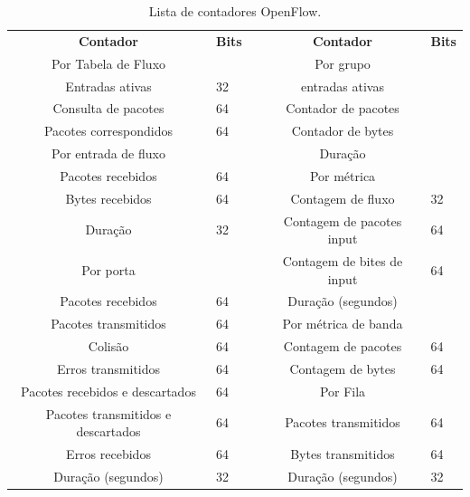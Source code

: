 \begin{table}[]
\caption{Lista de contadores OpenFlow.}
\label{tab:contadores}
\begin{tabular}{|c|l|l|c|l|}
\cline{1-2} \cline{4-5}
\textbf{Contador} & \textbf{Bits} &  & \textbf{Contador} & \multicolumn{1}{c|}{\textbf{Bits}} \\ \cline{1-2} \cline{4-5} 
Por Tabela de Fluxo &  &  & Por grupo & \multicolumn{1}{c|}{} \\ \cline{1-2} \cline{4-5} 
Entradas ativas & 32 &  & entradas ativas &  \\ \cline{1-2} \cline{4-5} 
Consulta de pacotes & 64 &  & Contador de pacotes &  \\ \cline{1-2} \cline{4-5} 
Pacotes correspondidos & 64 &  & Contador de bytes &  \\ \cline{1-2} \cline{4-5} 
Por entrada de fluxo &  &  & Duração &  \\ \cline{1-2} \cline{4-5} 
Pacotes recebidos & 64 &  & Por métrica & \multicolumn{1}{c|}{} \\ \cline{1-2} \cline{4-5} 
Bytes recebidos & 64 &  & Contagem de fluxo & 32 \\ \cline{1-2} \cline{4-5} 
Duração & 32 &  & Contagem de pacotes input & 64 \\ \cline{1-2} \cline{4-5} 
Por porta &  &  & Contagem de bites de input & 64 \\ \cline{1-2} \cline{4-5} 
Pacotes recebidos & 64 &  & Duração (segundos) &  \\ \cline{1-2} \cline{4-5} 
Pacotes transmitidos & 64 &  & Por métrica de banda & \multicolumn{1}{c|}{} \\ \cline{1-2} \cline{4-5} 
Colisão & 64 &  & Contagem de pacotes & 64 \\ \cline{1-2} \cline{4-5} 
Erros transmitidos & 64 &  & Contagem de bytes & 64 \\ \cline{1-2} \cline{4-5} 
Pacotes recebidos e descartados & 64 &  & Por Fila & \multicolumn{1}{c|}{} \\ \cline{1-2} \cline{4-5} 
Pacotes transmitidos e descartados & 64 &  & Pacotes transmitidos & 64 \\ \cline{1-2} \cline{4-5} 
Erros recebidos & 64 &  & Bytes transmitidos & 64 \\ \cline{1-2} \cline{4-5} 
Duração (segundos) & 32 &  & Duração (segundos) & 32 \\ \cline{1-2} \cline{4-5} 
\end{tabular}
\end{table}

